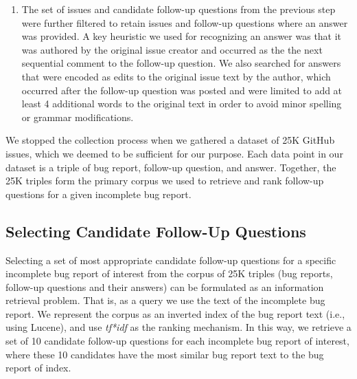 \begin{enumerate}
\item The set of issues and candidate follow-up questions from the previous step were further filtered to
retain issues and follow-up questions where an answer was provided. A key heuristic we used for recognizing an answer was that it was authored
by the original issue creator and occurred as the the next sequential comment
to the follow-up question. We also searched for answers that were encoded as edits to the original issue text by the author, which occurred after the follow-up question was posted and were limited to add at least 4 additional words to the original text in order to avoid minor spelling or grammar modifications.
\end{enumerate}

 We stopped the collection process when we gathered a dataset of 25K GitHub issues, which we deemed to be sufficient for our purpose. Each data point in our dataset is a triple of
bug report, follow-up question, and answer. Together, the 25K triples form the primary corpus we used to
retrieve and rank follow-up questions for a given incomplete bug report.


\subsection{Selecting Candidate Follow-Up Questions}

Selecting a set of most appropriate candidate follow-up questions for a specific incomplete bug report of interest from the corpus
of 25K triples (bug reports, follow-up questions and their answers) can be formulated as an information retrieval
problem. That is, as a query we use the text of the incomplete bug report. We represent the corpus
as an inverted index of the bug report text (i.e., using Lucene), and use {\em tf*idf} as the
ranking mechanism. In this way, we retrieve a set of 10 candidate follow-up questions for each incomplete bug report
of interest, where these 10 candidates have the most similar bug report text to the bug report of index.

